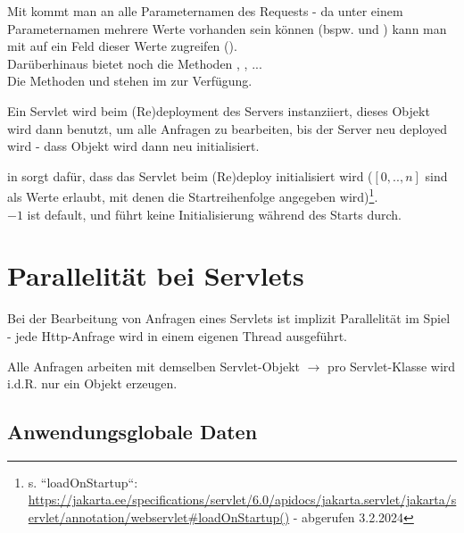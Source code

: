 \noindent
Mit  kommt man an alle Parameternamen des Requests - da unter einem Parameternamen mehrere Werte vorhanden sein können  (bspw.  und ) kann man mit  auf ein Feld dieser Werte zugreifen ().\\

\noindent
Darüberhinaus bietet  noch die Methoden , , ...\\

\noindent
Die Methoden  und  stehen im  zur Verfügung.

\noindent
Ein Servlet wird beim (Re)deployment des Servers instanziiert, dieses Objekt wird  dann benutzt, um alle Anfragen zu bearbeiten, bis der Server neu deployed wird -  dass Objekt wird dann neu initialisiert.

\begin{tcolorbox}
     in  sorgt dafür, dass das Servlet beim (Re)deploy initialisiert wird ($[0, .., n]$ sind als Werte erlaubt, mit denen die Startreihenfolge angegeben wird)\footnote{
        s. ``loadOnStartup``: \url{https://jakarta.ee/specifications/servlet/6.0/apidocs/jakarta.servlet/jakarta/servlet/annotation/webservlet#loadOnStartup()} - abgerufen 3.2.2024
    }.\\
    $-1$ ist default, und führt keine Initialisierung während des Starts durch.
\end{tcolorbox}


\section{Parallelität bei Servlets}

Bei der Bearbeitung von Anfragen eines Servlets ist implizit Parallelität im Spiel - jede Http-Anfrage wird in einem eigenen Thread ausgeführt.\\

\begin{tcolorbox}
Alle Anfragen arbeiten mit demselben Servlet-Objekt $\rightarrow$ pro Servlet-Klasse wird i.d.R. nur ein Objekt erzeugen.
\end{tcolorbox}


\subsection{Anwendungsglobale Daten}

